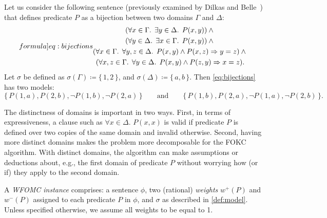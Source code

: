 \documentclass[a4paper,UKenglish,cleveref, autoref, thm-restate]{lipics-v2021}
\begin{document}
\begin{example}\label{example:bijections}
  Let us consider the following sentence (previously examined by Dilkas and
  Belle~\cite{DBLP:conf/kr/DilkasB23}) that defines predicate $P$ as a bijection
  between two domains $\Gamma$ and $\Delta$:
  \begin{equation}\label[formula]{eq:bijections}
    \begin{gathered}
      (\forall x \in \Gamma\text{. }\exists y \in \Delta\text{. }P(x, y))\land{}\\
      (\forall y \in \Delta\text{. }\exists x \in \Gamma\text{. }P(x, y))\land{}\\
      (\forall x \in \Gamma\text{. }\forall y, z \in \Delta\text{. }P(x, y) \land P(x, z) \Rightarrow y = z)\land{}\\
      (\forall x, z \in \Gamma\text{. }\forall y \in \Delta\text{. }P(x, y) \land P(z, y) \Rightarrow x = z).
    \end{gathered}
  \end{equation}
  Let $\sigma$ be defined as $\sigma(\Gamma) \coloneqq \{\, 1, 2\,\}$, and
  $\sigma(\Delta) \coloneqq \{\,a, b\,\}$. Then \cref{eq:bijections} has two
  models:
  \[
    \{\, P(1, a), P(2, b), \neg P(1, b), \neg P(2, a) \,\} \qquad \text{and} \qquad \{\, P(1, b), P(2, a), \neg P(1, a), \neg P(2, b) \,\}.
  \]
\end{example}

\begin{remark*}
  The distinctness of domains is important in two ways. First, in terms of
  expressiveness, a clause such as $\forall x \in \Delta\text{. }P(x, x)$ is
  valid if predicate $P$ is defined over two copies of the same domain and
  invalid otherwise. Second, having more distinct domains makes the problem more
  decomposable for the FOKC algorithm. With distinct domains, the algorithm can
  make assumptions or deductions about, e.g., the first domain of predicate $P$
  without worrying how (or if) they apply to the second domain.
\end{remark*}

\begin{definition}\label{def:instance}
  A \emph{WFOMC instance} comprises: a sentence $\phi$, two (rational)
  \emph{weights} $w^{+}(P)$ and $w^{-}(P)$ assigned to each predicate $P$ in
  $\phi$, and $\sigma$ as described in \cref{def:model}. Unless specified
  otherwise, we assume all weights to be equal to 1.
\end{definition}
\end{document}
